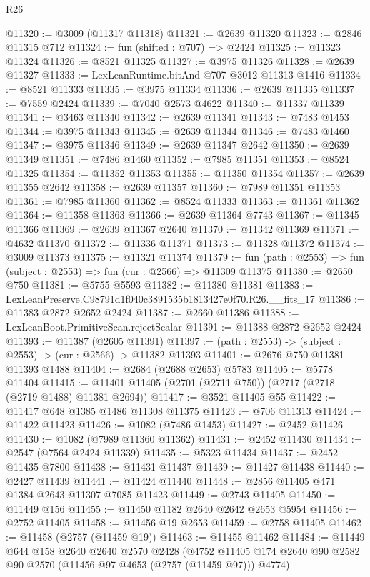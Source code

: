 \begin{lexlean}{R26}
\begin{coremodule}
@11320 := @3009 (@11317 @11318)
@11321 := @2639 @11320
@11323 := @2846 @11315 @712
@11324 := fun (shifted : @707) => @2424
@11325 := @11323 @11324
@11326 := @8521 @11325
@11327 := @3975 @11326
@11328 := @2639 @11327
@11333 := LexLeanRuntime.bitAnd @707 @3012 @11313 @1416
@11334 := @8521 @11333
@11335 := @3975 @11334
@11336 := @2639 @11335
@11337 := @7559 @2424
@11339 := @7040 @2573 @4622
@11340 := @11337 @11339
@11341 := @3463 @11340
@11342 := @2639 @11341
@11343 := @7483 @1453
@11344 := @3975 @11343
@11345 := @2639 @11344
@11346 := @7483 @1460
@11347 := @3975 @11346
@11349 := @2639 @11347 @2642
@11350 := @2639 @11349
@11351 := @7486 @1460
@11352 := @7985 @11351
@11353 := @8524 @11325
@11354 := @11352 @11353
@11355 := @11350 @11354
@11357 := @2639 @11355 @2642
@11358 := @2639 @11357
@11360 := @7989 @11351 @11353
@11361 := @7985 @11360
@11362 := @8524 @11333
@11363 := @11361 @11362
@11364 := @11358 @11363
@11366 := @2639 @11364 @7743
@11367 := @11345 @11366
@11369 := @2639 @11367 @2640
@11370 := @11342 @11369
@11371 := @4632 @11370
@11372 := @11336 @11371
@11373 := @11328 @11372
@11374 := @3009 @11373
@11375 := @11321 @11374
@11379 := fun (path : @2553) => fun (subject : @2553) => fun (cur : @2566) => @11309 @11375
@11380 := @2650 @750
@11381 := @5755 @5593
@11382 := @11380 @11381
@11383 := LexLeanPreserve.C98791d1f040c3891535b1813427e0f70.R26.__fits_17
@11386 := @11383 @2872 @2652 @2424
@11387 := @2660 @11386
@11388 := LexLeanBoot.PrimitiveScan.rejectScalar
@11391 := @11388 @2872 @2652 @2424
@11393 := @11387 (@2605 @11391)
@11397 := (path : @2553) -> (subject : @2553) -> (cur : @2566) -> @11382 @11393
@11401 := @2676 @750 @11381 @11393 @1488
@11404 := @2684 (@2688 @2653) @5783
@11405 := @5778 @11404
@11415 := @11401 @11405 (@2701 (@2711 @750)) (@2717 (@2718 (@2719 @1488) @11381 @2694))
@11417 := @3521 @11405 @55
@11422 := @11417 @648 @1385 @1486 @11308 @11375
@11423 := @706 @11313
@11424 := @11422 @11423
@11426 := @1082 (@7486 @1453)
@11427 := @2452 @11426
@11430 := @1082 (@7989 @11360 @11362)
@11431 := @2452 @11430
@11434 := @2547 (@7564 @2424 @11339)
@11435 := @5323 @11434
@11437 := @2452 @11435 @7800
@11438 := @11431 @11437
@11439 := @11427 @11438
@11440 := @2427 @11439
@11441 := @11424 @11440
@11448 := @2856 @11405 @471 @1384 @2643 @11307 @7085 @11423
@11449 := @2743 @11405
@11450 := @11449 @156
@11455 := @11450 @1182 @2640 @2642 @2653 @5954
@11456 := @2752 @11405
@11458 := @11456 @19 @2653
@11459 := @2758 @11405
@11462 := @11458 (@2757 (@11459 @19))
@11463 := @11455 @11462
@11484 := @11449
    @644
    @158
    @2640
    @2640
    @2570
    @2428
    (@4752 @11405 @174 @2640 @90 @2582 @90 @2570 (@11456 @97 @4653 (@2757 (@11459 @97))) @4774)

\end{coremodule}
\end{lexlean}
